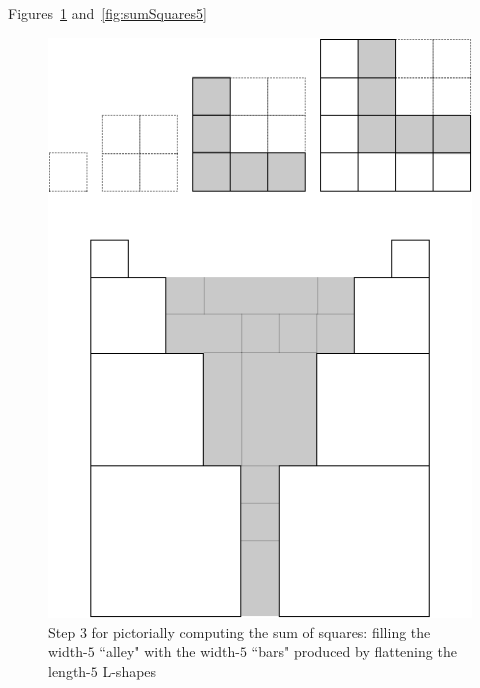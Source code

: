 \bigskip

Figures~\ref{fig:sumSquares4} and~\ref{fig:sumSquares5}
\begin{figure}[ht]
\begin{center}
       \includegraphics[scale=0.3]{FiguresMaths/SumSquares4}
\caption{Step 3 for pictorially computing the sum of squares: filling the width-$5$ ``alley" with the width-$5$ ``bars" produced by flattening the length-$5$ L-shapes}
       \label{fig:sumSquares4}
\end{center}
\end{figure}
